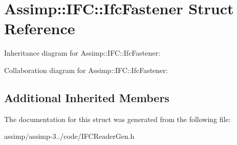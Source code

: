 \hypertarget{struct_assimp_1_1_i_f_c_1_1_ifc_fastener}{\section{Assimp\+:\+:I\+F\+C\+:\+:Ifc\+Fastener Struct Reference}
\label{struct_assimp_1_1_i_f_c_1_1_ifc_fastener}
}


Inheritance diagram for Assimp\+:\+:I\+F\+C\+:\+:Ifc\+Fastener\+:


Collaboration diagram for Assimp\+:\+:I\+F\+C\+:\+:Ifc\+Fastener\+:
\subsection*{Additional Inherited Members}


The documentation for this struct was generated from the following file\+:\begin{DoxyCompactItemize}
\item 
assimp/assimp-\/3../code/I\+F\+C\+Reader\+Gen.\+h\end{DoxyCompactItemize}
